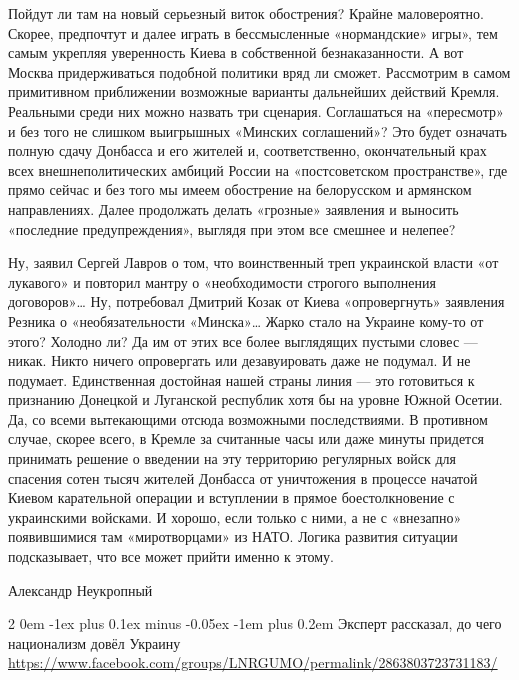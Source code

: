\documentclass[a4paper,11pt]{extreport}
\makeatletter
\renewcommand\subsection{%
  \clearpage
    \@startsection{subsection}%
    {2}%
    {0em}%
    {-1ex plus 0.1ex minus -0.05ex}%
    {-1em plus 0.2em}%
    {\scshape\bfseries\Large}%
}
\makeatother
\begin{document}
Пойдут ли там на новый серьезный виток обострения? Крайне маловероятно. Скорее,
предпочтут и далее играть в бессмысленные «нормандские» игры», тем самым
укрепляя уверенность Киева в собственной безнаказанности. А вот Москва
придерживаться подобной политики вряд ли сможет. Рассмотрим в самом примитивном
приближении возможные варианты дальнейших действий Кремля. Реальными среди них
можно назвать три сценария. Соглашаться на «пересмотр» и без того не слишком
выигрышных «Минских соглашений»? Это будет означать полную сдачу Донбасса и его
жителей и, соответственно, окончательный крах всех внешнеполитических амбиций
России на «постсоветском пространстве», где прямо сейчас и без того мы имеем
обострение на белорусском и армянском направлениях. Далее продолжать делать
«грозные» заявления и выносить «последние предупреждения», выглядя при этом все
смешнее и нелепее?

Ну, заявил Сергей Лавров о том, что воинственный треп украинской власти «от
лукавого» и повторил мантру о «необходимости строгого выполнения договоров»…
Ну, потребовал Дмитрий Козак от Киева «опровергнуть» заявления Резника о
«необязательности «Минска»… Жарко стало на Украине кому-то от этого? Холодно
ли? Да им от этих все более выглядящих пустыми словес --- никак. Никто ничего
опровергать или дезавуировать даже не подумал. И не подумает. Единственная
достойная нашей страны линия --- это готовиться к признанию Донецкой и Луганской
республик хотя бы на уровне Южной Осетии. Да, со всеми вытекающими отсюда
возможными последствиями. В противном случае, скорее всего, в Кремле за
считанные часы или даже минуты придется принимать решение о введении на эту
территорию регулярных войск для спасения сотен тысяч жителей Донбасса от
уничтожения в процессе начатой Киевом карательной операции и вступлении в
прямое боестолкновение с украинскими войсками. И хорошо, если только с ними, а
не с «внезапно» появившимися там «миротворцами» из НАТО. Логика развития
ситуации подсказывает, что все может прийти именно к этому.

Александр Неукропный
  
 
 
  
\subsection{Эксперт рассказал, до чего национализм довёл Украину}
\label{sec:21_07_2020.fb.lnr.18}
\url{https://www.facebook.com/groups/LNRGUMO/permalink/2863803723731183/}
\end{document}

